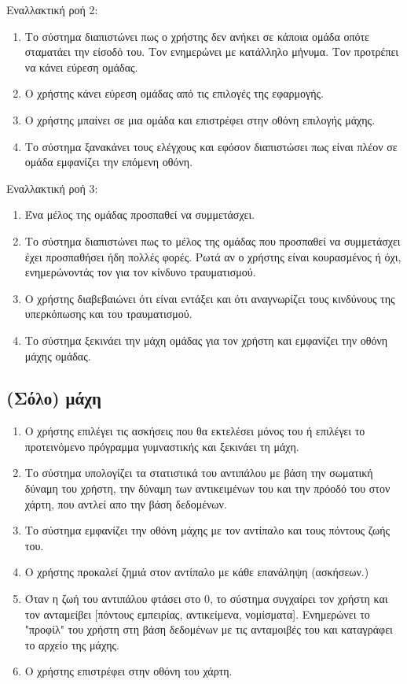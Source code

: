 Εναλλακτική ροή 2:
\begin{enumerate}[label=2.\alph*.,ref=2.\alph*]
\item Το σύστημα διαπιστώνει πως ο χρήστης δεν ανήκει σε κάποια ομάδα οπότε σταματάει την είσοδό του. Τον ενημερώνει με κατάλληλο μήνυμα. Τον προτρέπει να κάνει εύρεση ομάδας.
\item Ο χρήστης κάνει εύρεση ομάδας από τις επιλογές της εφαρμογής.
\item Ο χρήστης μπαίνει σε μια ομάδα και επιστρέφει στην οθόνη επιλογής μάχης.
\item Το σύστημα ξανακάνει τους ελέγχους και εφόσον διαπιστώσει πως είναι πλέον σε ομάδα εμφανίζει την επόμενη οθόνη.
\end{enumerate}

Εναλλακτική ροή 3:
\begin{enumerate}[label=6.\alph*.,ref=6.\alph*]
\item Ένα μέλος της ομάδας προσπαθεί να συμμετάσχει.
\item Το σύστημα διαπιστώνει πως το μέλος της ομάδας που προσπαθεί να συμμετάσχει έχει προσπαθήσει ήδη πολλές φορές. Ρωτά αν ο χρήστης είναι κουρασμένος ή όχι, ενημερώνοντάς τον για τον κίνδυνο τραυματισμού.
\item Ο χρήστης διαβεβαιώνει ότι είναι εντάξει και ότι αναγνωρίζει τους κινδύνους της υπερκόπωσης και του τραυματισμού.
\item Το σύστημα ξεκινάει την μάχη ομάδας για τον χρήστη και εμφανίζει την οθόνη μάχης ομάδας.
\end{enumerate}

\newpage
\subsection{(Σόλο) μάχη}
\label{sec:solo}
\begin{enumerate}
    \item Ο χρήστης επιλέγει τις ασκήσεις που θα εκτελέσει μόνος του ή επιλέγει το προτεινόμενο πρόγραμμα γυμναστικής και ξεκινάει τη μάχη. %
    \item Το σύστημα υπολογίζει τα στατιστικά του αντιπάλου με βάση την σωματική δύναμη του χρήστη, την δύναμη των αντικειμένων του και την πρόοδό του στον χάρτη, που αντλεί απο την βάση δεδομένων.
    \item Το σύστημα εμφανίζει την οθόνη μάχης με τον αντίπαλο και τους πόντους ζωής του.
    \item Ο χρήστης προκαλεί ζημιά στον αντίπαλο με κάθε επανάληψη (ασκήσεων.)
    \item Όταν η ζωή του αντιπάλου φτάσει στο 0, το σύστημα συγχαίρει τον χρήστη και τον ανταμείβει [πόντους εμπειρίας, αντικείμενα, νομίσματα]. Ενημερώνει το "προφίλ" του χρήστη στη βάση δεδομένων με τις ανταμοιβές του και καταγράφει το αρχείο της μάχης.
    \item Ο χρήστης επιστρέφει στην οθόνη του χάρτη.
\end{enumerate}

